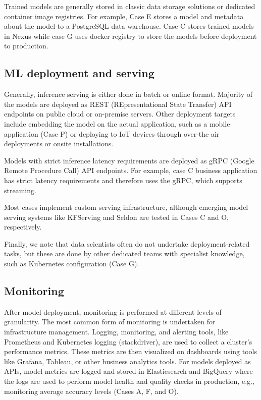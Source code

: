 Trained models are generally stored in classic data storage solutions or dedicated container image registries. For example, Case E stores a model and metadata about the model to a PostgreSQL data warehouse. Case C stores trained models in Nexus while case G uses docker registry to store the models before deployment to production.



\subsection{ML deployment and serving}
Generally, inference serving is either done in batch or online format. Majority of the models are deployed as REST (REpresentational State Transfer) API endpoints on public cloud or on-premise servers. Other deployment targets include embedding the model on the actual application, such as a mobile application (Case P) or deploying to IoT devices through over-the-air deployments or onsite installations.

Models with strict inference latency requirements are deployed as gRPC (Google Remote Procedure Call) API endpoints. For example, case C business application has strict latency requirements and therefore uses the gRPC, which supports streaming.

Most cases implement custom serving infrastructure, although emerging model serving systems like KFServing and Seldon are tested in Cases C and O, respectively. 

Finally, we note that data scientists often do not undertake deployment-related tasks, but these are done by other dedicated teams with specialist knowledge, such as Kubernetes configuration (Case G).

\subsection{Monitoring}
After model deployment, monitoring is performed at different levels of granularity. The most common form of monitoring is undertaken for infrastructure management. Logging, monitoring, and alerting tools, like Prometheus and Kubernetes logging (stackdriver), are used to collect a cluster's performance metrics. These metrics are then visualized on dashboards using tools like Grafana, Tableau, or other business analytics tools. For models deployed as APIs, model metrics are logged and stored in Elasticsearch and BigQuery where the logs are used to perform model health and quality checks in production, e.g., monitoring average accuracy levels (Cases A, F, and O).

